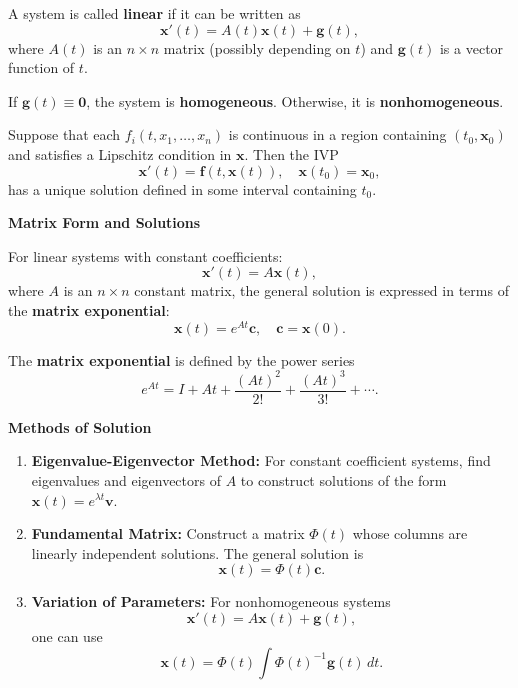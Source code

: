     
    \begin{definition}
      A system is called \textbf{linear} if it can be written as
      \[
      \mathbf{x}'(t) = A(t)\mathbf{x}(t) + \mathbf{g}(t),
      \]
      where $A(t)$ is an $n \times n$ matrix (possibly depending on $t$) and $\mathbf{g}(t)$ is a vector function of $t$.
    \end{definition}

    \begin{highlight}
    If $\mathbf{g}(t) \equiv \mathbf{0}$, the system is \textbf{homogeneous}. Otherwise, it is \textbf{nonhomogeneous}.
    \end{highlight}

    
    \begin{theorem}
      Suppose that each $f_i(t, x_1,\dots,x_n)$ is continuous in a region containing $(t_0,\mathbf{x}_0)$ and satisfies a Lipschitz condition in $\mathbf{x}$. Then the IVP
      \[
      \mathbf{x}'(t) = \mathbf{f}(t,\mathbf{x}(t)), \quad \mathbf{x}(t_0)=\mathbf{x}_0,
      \]
      has a unique solution defined in some interval containing $t_0$.
    \end{theorem}

    \textbf{Matrix Form and Solutions}

      For linear systems with constant coefficients:
      \[
      \mathbf{x}'(t) = A\mathbf{x}(t),
      \]
      where $A$ is an $n\times n$ constant matrix, the general solution is expressed in terms of the \textbf{matrix exponential}:
      \[
      \mathbf{x}(t) = e^{At}\mathbf{c}, \quad \mathbf{c} = \mathbf{x}(0).
      \]

      \begin{definition}
        The \textbf{matrix exponential} is defined by the power series
        \[
        e^{At} = I + At + \frac{(At)^2}{2!} + \frac{(At)^3}{3!} + \cdots.
        \]
      \end{definition}

    \textbf{Methods of Solution}
      \begin{enumerate}
        \item \textbf{Eigenvalue-Eigenvector Method:}  
        For constant coefficient systems, find eigenvalues and eigenvectors of $A$ to construct solutions of the form $\mathbf{x}(t) = e^{\lambda t}\mathbf{v}$.
        
        \item \textbf{Fundamental Matrix:}  
        Construct a matrix $\Phi(t)$ whose columns are linearly independent solutions. The general solution is
        \[
        \mathbf{x}(t) = \Phi(t)\mathbf{c}.
        \]
        
        \item \textbf{Variation of Parameters:}  
        For nonhomogeneous systems
        \[
        \mathbf{x}'(t) = A\mathbf{x}(t) + \mathbf{g}(t),
        \]
        one can use
        \[
        \mathbf{x}(t) = \Phi(t)\int \Phi(t)^{-1}\mathbf{g}(t)\, dt.
        \]
      \end{enumerate}

